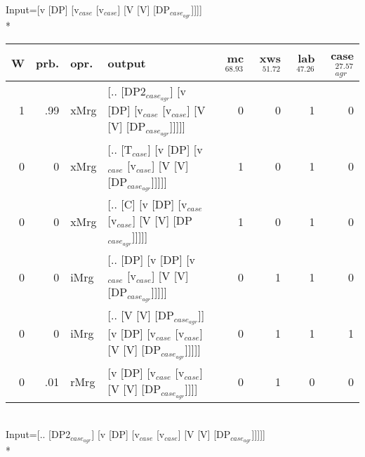 \begingroup\scriptsize Input=[v [DP] [v$_{case}$ [v$_{case}$] [V [V] [DP$_{case_{agr}}$]]]]\\*
\begin{tabularx}{\linewidth}{rrlXrrrr}
\hline
   W &   prb. & opr.   & output                                                                      &   mc$^{68.93}$ &   xws$^{51.72}$ &   lab$^{47.26}$ &   case$_{agr}^{27.57}$ \\
\hline
   1 &   .99 & xMrg & [.. [DP2$_{case_{agr}}$] [v [DP] [v$_{case}$ [v$_{case}$] [V [V] [DP$_{case_{agr}}$]]]]]        &            0 &             0 &             1 &                  0 \\
   0 &   0 & xMrg & [.. [T$_{case}$] [v [DP] [v$_{case}$ [v$_{case}$] [V [V] [DP$_{case_{agr}}$]]]]]              &            1 &             0 &             1 &                  0 \\
   0 &   0 & xMrg & [.. [C] [v [DP] [v$_{case}$ [v$_{case}$] [V [V] [DP$_{case_{agr}}$]]]]]                   &            1 &             0 &             1 &                  0 \\
   0 &   0 & iMrg & [.. [DP] [v [DP] [v$_{case}$ [v$_{case}$] [V [V] [DP$_{case_{agr}}$]]]]]                  &            0 &             1 &             1 &                  0 \\
   0 &   0 & iMrg & [.. [V [V] [DP$_{case_{agr}}$]] [v [DP] [v$_{case}$ [v$_{case}$] [V [V] [DP$_{case_{agr}}$]]]]] &            0 &             1 &             1 &                  1 \\
   0 &   .01 & rMrg & [v [DP] [v$_{case}$ [v$_{case}$] [V [V] [DP$_{case_{agr}}$]]]]                            &            0 &             1 &             0 &                  0 \\
\hline
\end{tabularx}\endgroup\\
\begingroup\scriptsize Input=[.. [DP2$_{case_{agr}}$] [v [DP] [v$_{case}$ [v$_{case}$] [V [V] [DP$_{case_{agr}}$]]]]]\\*
